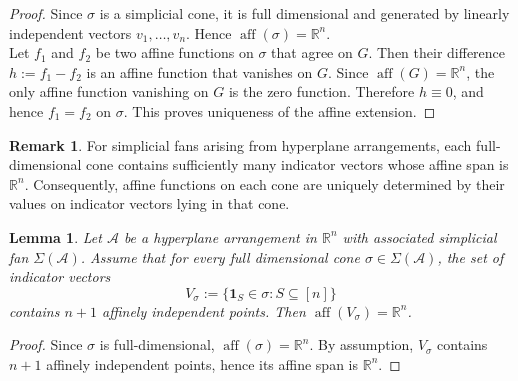 \documentclass{amsart}
\newtheorem{lemma}[theorem]{Lemma}
\theoremstyle{definition}
\newtheorem{remark}[theorem]{Remark}
\begin{document}
\begin{proof}
Since $\sigma$ is a simplicial cone, it is full dimensional and generated by linearly independent vectors $v_1,\dots,v_n$. Hence $\operatorname{aff}(\sigma) = \mathbb{R}^n$. \\
\noindent
Let $f_1$ and $f_2$ be two affine functions on $\sigma$ that agree on $G$. Then their difference $h := f_1 - f_2$ is an affine function that vanishes on $G$. Since $\operatorname{aff}(G) = \mathbb{R}^n$, the only affine function vanishing on $G$ is the zero function. Therefore $h \equiv 0$, and hence $f_1 = f_2$ on $\sigma$. This proves uniqueness of the affine extension.
\end{proof}
\begin{remark}
For simplicial fans arising from hyperplane arrangements, each full-dimensional cone contains sufficiently many indicator vectors whose affine span is $\mathbb{R}^n$. Consequently, affine functions on each cone are uniquely determined by their values on indicator vectors lying in that cone.
\end{remark}
\begin{lemma}\label{lem:indicator}
Let $\mathcal{A}$ be a hyperplane arrangement in $\mathbb{R}^n$ with associated simplicial fan $\Sigma(\mathcal{A})$. Assume that for every full dimensional cone $\sigma \in \Sigma(\mathcal{A})$, the set of indicator vectors
\[
V_\sigma := \{ \mathbf{1}_S \in \sigma : S \subseteq [n] \}
\]
contains $n+1$ affinely independent points. Then $\operatorname{aff}(V_\sigma) = \mathbb{R}^n$.
\end{lemma}

\begin{proof}
Since $\sigma$ is full-dimensional, $\operatorname{aff}(\sigma) = \mathbb{R}^n$. By assumption, $V_\sigma$ contains $n+1$ affinely independent points, hence its affine span is $\mathbb{R}^n$.
\end{proof}
\end{document}
